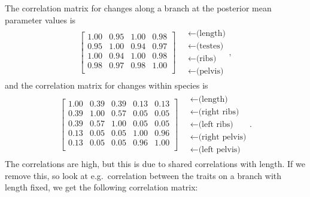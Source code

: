 \documentclass{article}
\begin{document}
The correlation matrix for changes along a branch at the posterior mean parameter values is \\
\begin{align}
\begin{bmatrix}
   1.00 & 0.95 & 1.00 & 0.98 \\ 
   0.95 & 1.00 & 0.94 & 0.97 \\ 
   1.00 & 0.94 & 1.00 & 0.98 \\ 
   0.98 & 0.97 & 0.98 & 1.00 \\ 
 \end{bmatrix}
\quad \begin{matrix}
  \leftarrow \text{(length)} \\
  \leftarrow \text{(testes)} \\
  \leftarrow \text{(ribs)} \\
  \leftarrow \text{(pelvis)} 
\end{matrix} ,
\end{align}
and the correlation matrix for changes within species is
\begin{align}
\begin{bmatrix}
   1.00 & 0.39 & 0.39 & 0.13 & 0.13 \\ 
   0.39 & 1.00 & 0.57 & 0.05 & 0.05 \\ 
   0.39 & 0.57 & 1.00 & 0.05 & 0.05 \\ 
   0.13 & 0.05 & 0.05 & 1.00 & 0.96 \\ 
   0.13 & 0.05 & 0.05 & 0.96 & 1.00 \\ 
 \end{bmatrix}
\quad \begin{matrix}
  \leftarrow \text{(length)} \\
  \leftarrow \text{(right ribs)} \\
  \leftarrow \text{(left ribs)} \\
  \leftarrow \text{(right pelvis)} \\
  \leftarrow \text{(left pelvis)} 
\end{matrix}  .
\end{align}
The correlations are high, but this is due to shared correlations with length.
If we remove this, so look at e.g.\ correlation between the traits on a branch with length fixed,
we get the following correlation matrix:
\end{document}

